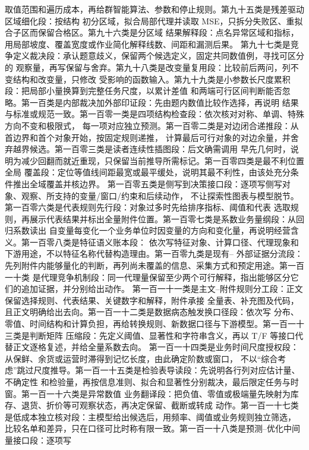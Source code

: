 \documentclass[UTF8,a4paper,12pt]{ctexart}
\begin{document}
取值范围和遍历成本，再给群智能算法、参数和停止规则。第九十五类是残差驱动区域细化段：按结构
初分区域，拟合局部代理并读取 MSE，只拆分失败区、重拟合子区而保留合格区。第九十六类是分区域
结果解释段：点名异常区域和指标，用局部坡度、覆盖宽度或作业简化解释线数、间距和漏测后果。
第九十七类是竞争定义裁决段：承认题意歧义，保留两个候选定义，固定共同数值例，寻找可区分的
观察量，再写保留与舍弃。第九十八类是改变量复用段：比较前后两问，列不变结构和改变量，只修改
受影响的函数输入。第九十九类是小参数长尺度累积段：把局部小量换算到完整任务尺度，以累计差值
和两端可行区间判断能否忽略。第一百类是内部裁决加外部印证段：先由题内数值比较作选择，再说明
结果与标准或规范一致。第一百零一类是四项结构检查段：依次核对对称、单调、特殊方向不变和极限式，
每一项对应独立预测。第一百零二类是对边闭合递推段：从首边界和首个对象开始，按固定规则递推，
计算最后可行对象的对边余量，并舍弃越界候选。第一百零三类是读者连续性插图段：后文确需调用
早先几何时，说明为减少回翻而就近重现，只保留当前推导所需标记。第一百零四类是最不利位置全局
覆盖段：定位等值线间距最宽或最平缓处，说明其最不利性，由该处充分条件推出全域覆盖并核边界。
第一百零五类是侧写到决策接口段：逐项写侧写对象、观察、所支持的变量/窗口/约束和后续动作，
不让探索性图表与模型脱节。第一百零六类是代表规则先行段：对象过多时先给排序指标、阈值和代表
选取规则，再展示代表结果并标出全量附件位置。第一百零七类是系数业务量纲段：从回归系数读出
自变量每变化一个业务单位时因变量的方向和变化量，再说明经营含义。第一百零八类是特征语义账本段：
依次写特征对象、计算口径、代理现象和下游用途，不以特征名称代替构造理由。第一百零九类是现有--
外部证据分流段：先列附件内能够量化的判断，再列尚未覆盖的信息、采集方式和预定用途。第一百一十类
是代理竞争机制段：同一代理量保留至少两个可行解释，指出能够区分它们的追加证据，并分别给出动作。
第一百一十一类是主文--附件规则分工段：正文保留选择规则、代表结果、关键数字和解释，附件承接
全量表、补充图及代码，且正文明确给出去向。第一百一十二类是数据病态触发换口径段：依次写
分布、零值、时间结构和计算负担，再给转换规则、新数据口径与下游模型。第一百一十三类是判断矩阵
压缩段：先定义阈值、显著性和字符串含义，再以 T/F 等接口代替正文逐格复述，并给全量系数去向。
第一百一十四类是业务时间尺度授权段：从保鲜、余货或运营时滞得到记忆长度，由此确定阶数或窗口，
不以“综合考虑”跳过尺度推导。第一百一十五类是检验表导读段：先说明各行列对应估计量、不确定性
和检验量，再按信息准则、拟合和显著性分别裁决，最后限定任务与时窗。第一百一十六类是异常数值
业务翻译段：把负值、零值或极端量先映射为库存、退货、折价等可观察状态，再决定保留、截断或转成
动作。第一百一十七类是低成本独立核对段：主模型给出候选后，用频率、阈值或业务规则独立筛选，
比较名单和差异，只在口径可比时称有限一致。第一百一十八类是预测--优化中间量接口段：逐项写
\end{document}
